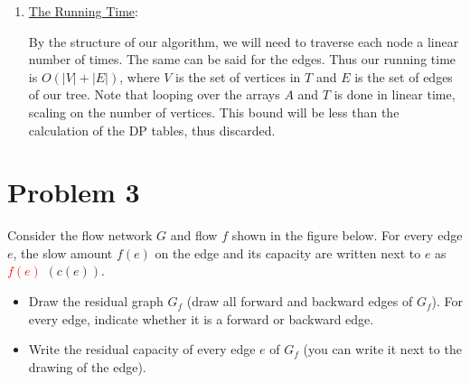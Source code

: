 \begin{solution}
\begin{enumerate}
        \newpage
        \item \underline{The Running Time}:

        \hop
        By the structure of our algorithm, we will need to traverse each node a linear number of times. The same can be said for the edges. Thus our running time is $O(|V| + |E|)$, where $V$ is the set of vertices in $T$ and $E$ is the set of edges of our tree. Note that looping over the arrays $A$ and $T$ is done in linear time, scaling on the number of vertices. This bound will be less than the calculation of the DP tables, thus discarded. 
    \end{enumerate}
\end{solution}
\newpage
\section{Problem 3}
Consider the flow network $G$ and flow $f$ shown in the figure below. For every edge $e$, the slow amount $f(e)$ on the edge and its capacity are written next to $e$ as \textcolor{red}{$f(e)$} $(c(e))$.
\begin{itemize}[$\bullet$]
    \item Draw the residual graph $G_f$ (draw all forward and backward edges of $G_f$). For every edge, indicate whether it is a forward or backward edge.
    \item Write the residual capacity of every edge $e$ of $G_f$ (you can write it next to the drawing of the edge).
\end{itemize}

